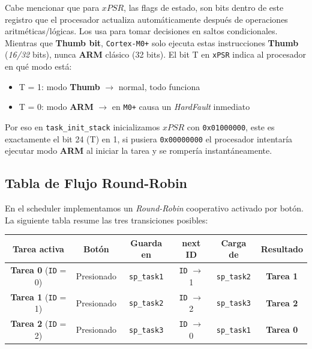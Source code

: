 \documentclass[12pt,letterpaper]{article}
\begin{document}
Cabe mencionar que para $xPSR$, las flags de estado, son bits dentro de este registro que el procesador actualiza automáticamente después de operaciones aritméticas/lógicas. Los usa para tomar decisiones en saltos condicionales.\\

\noindent
Mientras que \textbf{Thumb bit}, \texttt{Cortex-M0+} solo ejecuta estas instrucciones \textbf{Thumb} (\textit{16/32} bits), nunca \textbf{ARM} clásico (32 bits). El bit T en \texttt{xPSR} indica al procesador en qué modo está:

\begin{itemize}
\item T = 1: modo \textbf{Thumb} $\rightarrow$ normal, todo funciona
\item T = 0: modo \textbf{ARM} $\rightarrow$ en \texttt{M0+} causa un \textit{HardFault} inmediato
\end{itemize}

\noindent
Por eso en \texttt{task\_init\_stack} inicializamos $xPSR$ con \texttt{0x01000000}, este es exactamente el bit 24 (T) en 1, si pusiera \texttt{0x00000000} el procesador intentaría ejecutar modo \textbf{ARM} al iniciar la tarea y se rompería instantáneamente.

\subsection*{Tabla de Flujo Round-Robin}
En el scheduler implementamos un \textit{Round-Robin} cooperativo activado por botón. La siguiente tabla resume las tres transiciones posibles:

\begin{table}[h]
\centering
\begin{tabular}{|c|c|c|c|c|c|}
\hline
\textbf{Tarea activa} & \textbf{Botón} & \textbf{Guarda en} & \textbf{next ID} & \textbf{Carga de} & \textbf{Resultado} \\
\hline
\textbf{Tarea 0} (\texttt{ID} = 0) & Presionado & \texttt{sp\_task1} & \texttt{ID} $\rightarrow$ 1 & \texttt{sp\_task2} & \textbf{Tarea 1} \\
\hline
\textbf{Tarea 1} (\texttt{ID} = 1) & Presionado & \texttt{sp\_task2} & \texttt{ID} $\rightarrow$ 2 & \texttt{sp\_task3} & \textbf{Tarea 2} \\
\hline
\textbf{Tarea 2} (\texttt{ID} = 2) & Presionado & \texttt{sp\_task3} & \texttt{ID} $\rightarrow$ 0 & \texttt{sp\_task1} & \textbf{Tarea 0} \\
\hline
\end{tabular}
\end{table}
\end{document}
